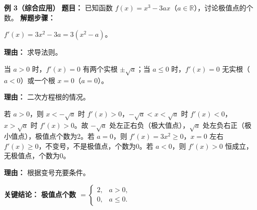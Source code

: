 \begin{examplebox}
	\medskip
	\textbf{\textcolor{CExample}{例 3（综合应用）}}
	\textbf{\textcolor{CExample}{题目：}}
	已知函数 $f(x)=x^3-3ax$（$a\in\mathbb{R}$），讨论极值点的个数。
	\textbf{\textcolor{CExample}{解题步骤：}}
	\begin{description}[style=nextline, leftmargin=2.8em, labelsep=0.5em, itemsep=0.45em]
		\item[\textbf{第一步（求导）：}]
			$f'(x)=3x^2-3a=3(x^2-a)$。
			\par\textbf{理由：} 求导法则。
		\item[\textbf{第二步（根的讨论）：}]
			当 $a>0$ 时，$f'(x)=0$ 有两个实根 $\pm\sqrt{a}$；当 $a\le 0$ 时，$f'(x)=0$ 无实根（$a<0$）或一个根 $x=0$（$a=0$）。
			\par\textbf{理由：} 二次方程根的情况。
		\item[\textbf{第三步（变号检验与结论）：}]
			若 $a>0$，则 $x<-\sqrt{a}$ 时 $f'(x)>0$，$-\sqrt{a}<x<\sqrt{a}$ 时 $f'(x)<0$，$x>\sqrt{a}$ 时 $f'(x)>0$。故 $-\sqrt{a}$ 处左正右负（极大值点），$\sqrt{a}$ 处左负右正（极小值点），极值点个数为2。若 $a=0$，则 $f'(x)=3x^2\ge 0$，$x=0$ 左右 $f'(x)\ge 0$，不变号，不是极值点，个数为0。若 $a<0$，则 $f'(x)>0$ 恒成立，无极值点，个数为0。
			\par\textbf{理由：} 根据变号充要条件。
	\end{description}
	\textbf{\textcolor{CExample}{关键结论：}}
	\textbf{极值点个数 $=
	\begin{cases}
		2, & a>0,\\0, & a\le 0.
	\end{cases}
	$}
\end{examplebox}
